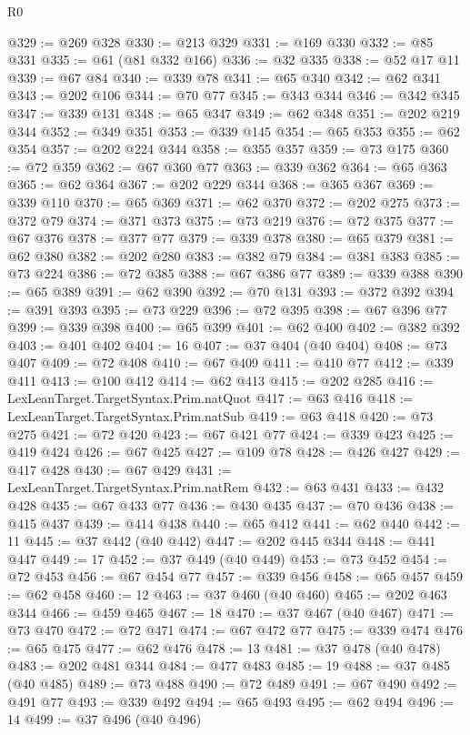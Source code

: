 \begin{lexlean}{R0}
\begin{coremodule}
@329 := @269 @328
@330 := @213 @329
@331 := @169 @330
@332 := @85 @331
@335 := @61 (@81 @332 @166)
@336 := @32 @335
@338 := @52 @17 @11
@339 := @67 @84
@340 := @339 @78
@341 := @65 @340
@342 := @62 @341
@343 := @202 @106
@344 := @70 @77
@345 := @343 @344
@346 := @342 @345
@347 := @339 @131
@348 := @65 @347
@349 := @62 @348
@351 := @202 @219 @344
@352 := @349 @351
@353 := @339 @145
@354 := @65 @353
@355 := @62 @354
@357 := @202 @224 @344
@358 := @355 @357
@359 := @73 @175
@360 := @72 @359
@362 := @67 @360 @77
@363 := @339 @362
@364 := @65 @363
@365 := @62 @364
@367 := @202 @229 @344
@368 := @365 @367
@369 := @339 @110
@370 := @65 @369
@371 := @62 @370
@372 := @202 @275
@373 := @372 @79
@374 := @371 @373
@375 := @73 @219
@376 := @72 @375
@377 := @67 @376
@378 := @377 @77
@379 := @339 @378
@380 := @65 @379
@381 := @62 @380
@382 := @202 @280
@383 := @382 @79
@384 := @381 @383
@385 := @73 @224
@386 := @72 @385
@388 := @67 @386 @77
@389 := @339 @388
@390 := @65 @389
@391 := @62 @390
@392 := @70 @131
@393 := @372 @392
@394 := @391 @393
@395 := @73 @229
@396 := @72 @395
@398 := @67 @396 @77
@399 := @339 @398
@400 := @65 @399
@401 := @62 @400
@402 := @382 @392
@403 := @401 @402
@404 := 16
@407 := @37 @404 (@40 @404)
@408 := @73 @407
@409 := @72 @408
@410 := @67 @409
@411 := @410 @77
@412 := @339 @411
@413 := @100 @412
@414 := @62 @413
@415 := @202 @285
@416 := LexLeanTarget.TargetSyntax.Prim.natQuot
@417 := @63 @416
@418 := LexLeanTarget.TargetSyntax.Prim.natSub
@419 := @63 @418
@420 := @73 @275
@421 := @72 @420
@423 := @67 @421 @77
@424 := @339 @423
@425 := @419 @424
@426 := @67 @425
@427 := @109 @78
@428 := @426 @427
@429 := @417 @428
@430 := @67 @429
@431 := LexLeanTarget.TargetSyntax.Prim.natRem
@432 := @63 @431
@433 := @432 @428
@435 := @67 @433 @77
@436 := @430 @435
@437 := @70 @436
@438 := @415 @437
@439 := @414 @438
@440 := @65 @412
@441 := @62 @440
@442 := 11
@445 := @37 @442 (@40 @442)
@447 := @202 @445 @344
@448 := @441 @447
@449 := 17
@452 := @37 @449 (@40 @449)
@453 := @73 @452
@454 := @72 @453
@456 := @67 @454 @77
@457 := @339 @456
@458 := @65 @457
@459 := @62 @458
@460 := 12
@463 := @37 @460 (@40 @460)
@465 := @202 @463 @344
@466 := @459 @465
@467 := 18
@470 := @37 @467 (@40 @467)
@471 := @73 @470
@472 := @72 @471
@474 := @67 @472 @77
@475 := @339 @474
@476 := @65 @475
@477 := @62 @476
@478 := 13
@481 := @37 @478 (@40 @478)
@483 := @202 @481 @344
@484 := @477 @483
@485 := 19
@488 := @37 @485 (@40 @485)
@489 := @73 @488
@490 := @72 @489
@491 := @67 @490
@492 := @491 @77
@493 := @339 @492
@494 := @65 @493
@495 := @62 @494
@496 := 14
@499 := @37 @496 (@40 @496)

\end{coremodule}
\end{lexlean}
